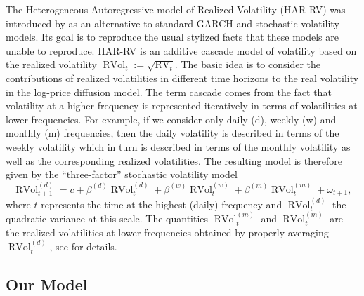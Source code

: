 \documentclass[11pt]{article}
\DeclareMathOperator{\RV}{RV}
\DeclareMathOperator{\RVol}{RVol}
\begin{document}
The Heterogeneous Autoregressive model of Realized Volatility (HAR-RV) was introduced by \cite{corsi-2009} as an alternative to standard GARCH and stochastic volatility models. Its goal is to reproduce the usual stylized facts that these models are unable to reproduce. HAR-RV is an additive cascade model of volatility based on the realized volatility \(\RVol_t:=\sqrt{\RV_t}\). The basic idea is to consider the contributions of realized volatilities in different time horizons to the real volatility in the log-price diffusion model. The term cascade comes from the fact that volatility at a higher frequency is represented iteratively in terms of volatilities at lower frequencies. For example, if we consider only daily (d), weekly (w) and monthly (m) frequencies, then the daily volatility is described in terms of the weekly volatility which in turn is described in terms of the monthly volatility as well as the corresponding realized volatilities. The resulting model is therefore given by the ``three-factor'' stochastic volatility model
\begin{equation*}
\RVol_{t+1}^{(d)}=c+\beta^{(d)}\RVol_t^{(d)}+\beta^{(w)}\RVol_t^{(w)}+\beta^{(m)}\RVol_t^{(m)}+\omega_{t+1},
\end{equation*}
where \(t\) represents the time at the highest (daily) frequency and \(\RVol_t^{(d)}\) the quadratic variance at this scale. The quantities \(\RVol_t^{(m)}\) and \(\RVol_t^{(m)}\) are the realized volatilities at lower frequencies obtained by properly averaging \(\RVol_t^{(d)}\), see \cite{corsi-2009} for details.

\subsection{Our Model}
\end{document}

